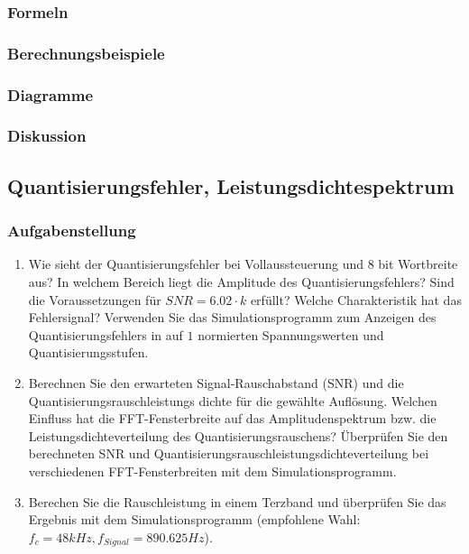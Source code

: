 \documentclass[12pt,a4paper,ngerman]{article}
\begin{document}
\subsubsection{Formeln}

\subsubsection{Berechnungsbeispiele}

\subsubsection{Diagramme}

\subsubsection{Diskussion}

%
%

\subsection{Quantisierungsfehler, Leistungsdichtespektrum}
\subsubsection{Aufgabenstellung}
\begin{enumerate}
\item Wie sieht der Quantisierungsfehler bei Vollaussteuerung und $8$ bit Wortbreite aus? In welchem Bereich liegt die Amplitude des Quantisierungsfehlers? Sind die Voraussetzungen für $SNR = 6.02 \cdot k$ erfüllt? Welche Charakteristik hat das Fehlersignal? Verwenden Sie das Simulationsprogramm zum Anzeigen des Quantisierungsfehlers in auf $1$ normierten Spannungswerten und Quantisierungsstufen. 
\item Berechnen Sie den erwarteten Signal-Rauschabstand (SNR) und die Quantisierungsrauschleistungs dichte für die gewählte Auflösung. Welchen Einfluss hat die FFT-Fensterbreite auf das Amplitudenspektrum bzw. die Leistungsdichteverteilung des Quantisierungsrauschens?
Überprüfen Sie den berechneten SNR und Quantisierungsrauschleistungsdichteverteilung bei verschiedenen FFT-Fensterbreiten mit dem Simulationsprogramm. 
\item Berechen Sie die Rauschleistung in einem Terzband und überprüfen Sie das Ergebnis mit dem Simulationsprogramm (empfohlene Wahl: $f_c = 48kHz, f_{Signal} = 890.625Hz$). 
\end{enumerate}
\end{document}
